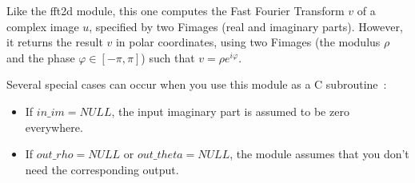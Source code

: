 Like the {\sf fft2d} module, this one computes the Fast Fourier Transform 
 $v$
of a complex image $u$, specified by two Fimages (real and imaginary parts). 
However, it returns the result $v$ in polar coordinates, 
using two Fimages (the modulus $\rho$ and the phase $\varphi \in [-\pi,\pi]$)
such that $v=\rho e^{i\varphi}$.

\vskip 0.3cm

Several special cases can occur when you use this module as a 
C subroutine~:
\begin{itemize}
\item If $in\_im=NULL$, the input imaginary part is assumed to be zero 
everywhere.
\item If $out\_rho=NULL$ or $out\_theta=NULL$, the module assumes that you
don't need the corresponding output.
\end{itemize}
